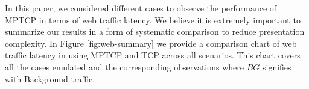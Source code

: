 In this paper, we considered different cases to observe the performance of MPTCP in terms of web traffic latency. We believe it is extremely important to
summarize our results in a form of systematic comparison to reduce presentation complexity. In Figure \ref{fig:web-summary} we provide a comparison 
chart of web traffic latency in using MPTCP and TCP across all scenarios. This chart covers all the cases emulated and the corresponding observations where $BG$ 
signifies with Background traffic. 

